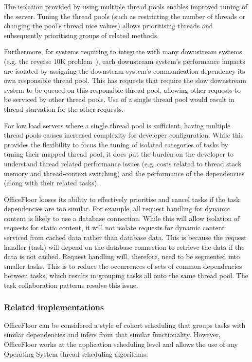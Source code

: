 \documentclass[prodmode]{style/acmlarge}
\begin{document}
The isolation provided by using multiple thread pools enables improved tuning of
the server.  Tuning the thread pools (such as restricting the number of threads
or changing the pool's thread nice values) allows prioritising threads and
subsequently prioritising groups of related methods.

Furthermore, for systems requiring to integrate with many downstream systems
(e.g. the reverse 10K problem~\cite{reverse-ten-k-problem}), each downstream
system's performance impacts are isolated by assigning the downsteam system's
communication dependency its own responsible thread pool.  This has requests
that require the slow downstream system to be queued on this responsible thread
pool, allowing other requests to be serviced by other thread pools.  Use of a
single thread pool would result in thread starvation for the other requests.

For low load servers where a single thread pool is sufficient, having multiple
thread pools causes increased complexity for developer configuration.  While
this provides the flexibility to focus the tuning of isolated categories of
tasks by tuning their mapped thread pool, it does put the burden on the
developer to understand thread related performance issues (e.g. costs related to
thread stack memory and thread-context switching) and the performance of the
dependencies (along with their related tasks).

OfficeFloor looses its ability to effectively prioritise and cancel tasks if the
task dependencies are too similar.  For example, all request handling for
dynamic content is likely to use a database connection.  While this will allow
isolation of requests for static content, it will not isolate requests for
dynamic content serviced from cached data rather than database data.  This is
because the request handler (task) will depend on the database connection to
retrieve the data if the data is not cached.  Request handling will, therefore,
need to be segmented into smaller tasks.  This is to reduce the occurrences of
sets of common dependencies between tasks, which results in grouping tasks all
onto the same thread pool.  The task collaboration patterns resolve this issue.


\subsubsection*{Related implementations}

OfficeFloor can be considered a style of cohort scheduling \cite{cohort}
that groups tasks with similar dependencies and infers from that similar
functionality.  However, OfficeFloor works at the application scheduling
level and allows the use of any Operating System thread scheduling algorithms.
\end{document}
